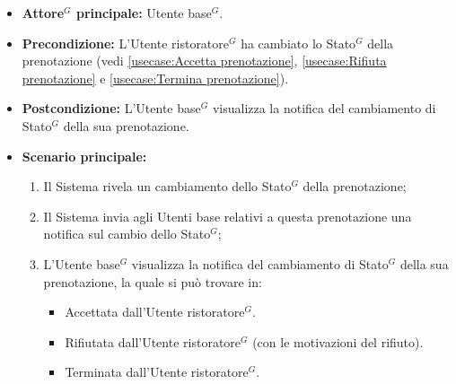 \label{usecase:Visualizzazione notifica \gls{Stato}$^G$ della prenotazione}
\begin{itemize}
	\item \textbf{\gls{Attore}$^G$ principale:} \gls{Utente base}$^G$.

	\item \textbf{Precondizione:} L'\gls{Utente ristoratore}$^G$ ha cambiato lo \gls{Stato}$^G$ della prenotazione (vedi \autoref{usecase:Accetta prenotazione},
	      \autoref{usecase:Rifiuta prenotazione} e \autoref{usecase:Termina prenotazione}).


	\item \textbf{Postcondizione:} L'\gls{Utente base}$^G$ visualizza la notifica del cambiamento di \gls{Stato}$^G$ della sua prenotazione.

	\item \textbf{Scenario principale:}
	      \begin{enumerate}
		      \item Il Sistema rivela un cambiamento dello \gls{Stato}$^G$ della prenotazione;
		      \item Il Sistema invia agli Utenti base relativi a questa
		            prenotazione una notifica sul cambio dello \gls{Stato}$^G$;
		      \item L'\gls{Utente base}$^G$ visualizza la notifica del cambiamento di \gls{Stato}$^G$ della sua prenotazione, la quale si può trovare in:
		            \begin{itemize}
			            \item Accettata dall'\gls{Utente ristoratore}$^G$.
			            \item Rifiutata dall'\gls{Utente ristoratore}$^G$ (con le motivazioni del rifiuto).
			            \item Terminata dall'\gls{Utente ristoratore}$^G$.
		            \end{itemize}
	      \end{enumerate}
\end{itemize}
